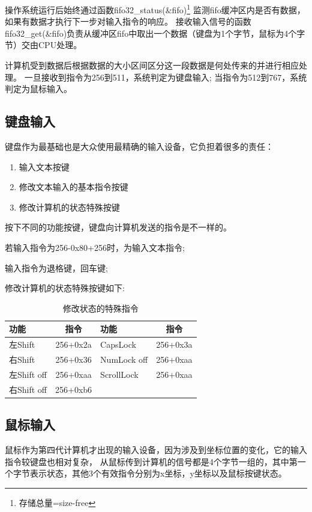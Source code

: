 操作系统运行后始终通过函数fifo32\_status(\&fifo)\footnote{存储总量=size-free}
监测fifo缓冲区内是否有数据，如果有数据才执行下一步对输入指令的响应。
接收输入信号的函数fifo32\_get(\&fifo)负责从缓冲区fifo中取出一个数据（键盘为1个字节，鼠标为4个字节）交由CPU处理。

计算机受到数据后根据数据的大小区间区分这一段数据是何处传来的并进行相应处理。
一旦接收到指令为256到511，系统判定为键盘输入;
当指令为512到767，系统判定为鼠标输入。


\subsection{键盘输入}

键盘作为最基础也是大众使用最精确的输入设备，它负担着很多的责任：
\begin{enumerate}
\item 输入文本按键
\item 修改文本输入的基本指令按键
\item 修改计算机的状态特殊按键
\end{enumerate}

按下不同的功能按键，键盘向计算机发送的指令是不一样的。

若输入指令为256-0x80+256时，为输入文本指令;

输入指令为退格键，回车键;

修改计算机的状态特殊按键如下:
\begin{table}[!ht]
  \centering
  \begin{tabular}{|l|c|l|c|}
    \hline 功能 & 指令 & 功能 & 指令 \\
    \hline 左Shift & 256+0x2a & CapsLock & 256+0x3a \\ 
    \hline 右Shift & 256+0x36 & NumLock off & 256+0xaa \\
    \hline 左Shift off & 256+0xaa & ScrollLock & 256+0xaa \\
    \hline 右Shift off & 256+0xb6 & & \\
    \hline
  \end{tabular}
  \caption{修改状态的特殊指令}
  \label{tab:hello}
\end{table}


\subsection{鼠标输入}

鼠标作为第四代计算机才出现的输入设备，因为涉及到坐标位置的变化，它的输入指令较键盘也相对复杂，
从鼠标传到计算机的信号都是4个字节一组的，其中第一个字节表示状态，其他3个有效指令分别为x坐标，y坐标以及鼠标按键状态。

